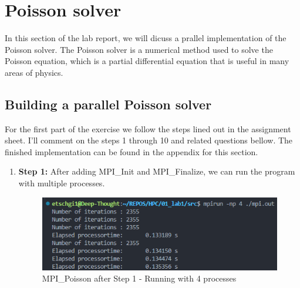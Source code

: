 \section{Poisson solver}
\label{sec:poisson}
In this section of the lab report, we will dicuss a prallel implementation of the Poisson solver. The Poisson solver is a numerical method used to solve the Poisson equation, which is a partial differential equation that is useful in many areas of physics. \\
\subsection{Building a parallel Poisson solver}
For the first part of the exercise we follow the steps lined out in the assignment sheet. I'll comment on the steps 1 through 10 and related questions bellow. The finished implementation can be found in the appendix for this section. \\
\begin{enumerate}
    \item \textbf{Step 1:} After adding MPI_Init and MPI_Finalize, we can run the program with multiple processes.  
    \begin{figure}[H]
        \centering
        \includegraphics[width=\textwidth]{../fig/lab1/step1.png}
        \caption{MPI_Poisson after Step 1 - Running with 4 processes}
        \label{fig:poisson_step1}
    \end{figure}
\end{enumerate}
